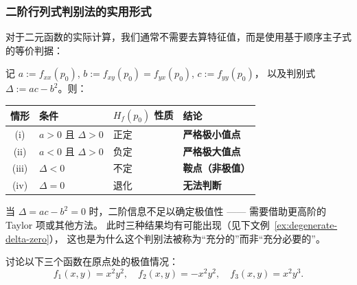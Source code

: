\documentclass[lang=cn,11pt]{elegantbook}
\begin{document}
\subsubsection*{二阶行列式判别法的实用形式}

对于二元函数的实际计算，我们通常不需要去算特征值，而是使用基于顺序主子式的等价判据：

\begin{property} \label{property:discriminant-four-cases}
记 $a:=f_{xx}(p_0)$, $b:=f_{xy}(p_0)=f_{yx}(p_0)$, $c:=f_{yy}(p_0)$，
以及判别式 $\Delta:=ac-b^2$。则：

\renewcommand{\arraystretch}{1.6}
\begin{center}
\begin{tabular}{@{}clll@{}}
\hline
情形 & 条件 & $H_f(p_0)$ 性质 & 结论 \\
\hline
(i)   & $a>0$ 且 $\Delta>0$ & 正定 & \textbf{严格极小值点} \\
(ii)  & $a<0$ 且 $\Delta>0$ & 负定 & \textbf{严格极大值点} \\
(iii) & $\Delta<0$           & 不定 & \textbf{鞍点（非极值）} \\
(iv)  & $\Delta=0$           & 退化 & \textbf{无法判断} \\
\hline
\end{tabular}
\end{center}
\end{property}

\begin{note}
当 $\Delta=ac-b^2=0$ 时，二阶信息不足以确定极值性 ——
需要借助更高阶的 Taylor 项或其他方法。
此时三种结果均有可能出现（见下文例~\ref{ex:degenerate-delta-zero}），
这也是为什么这个判别法被称为“充分的”而非“充分必要的”。
\end{note}


\begin{example}[退化的 Hesse 判别：$\Delta=0$ 的三种可能性] \label{ex:degenerate-delta-zero}
讨论以下三个函数在原点处的极值情况：
\[
f_1(x,y)=x^2y^2,\quad f_2(x,y)=-x^2y^2,\quad f_3(x,y)=x^2y^3.
\]
\end{example}
\end{document}
